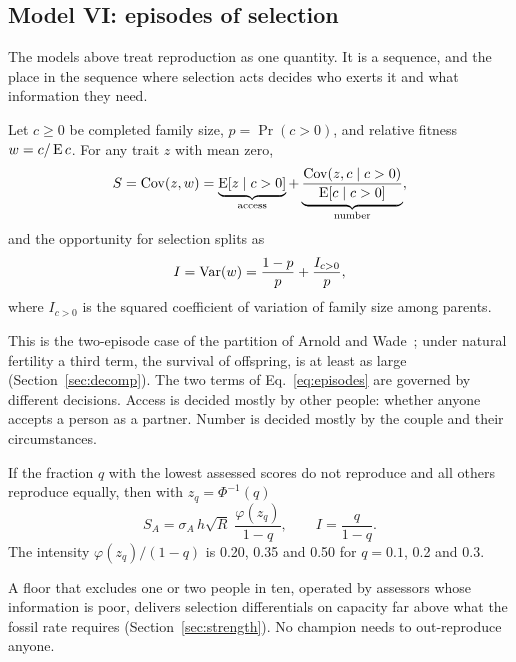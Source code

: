 \subsection{Model VI: episodes of selection}\label{sec:episodes}

The models above treat reproduction as one quantity. It is a sequence, and the place in the sequence where selection acts
decides who exerts it and what information they need.

\begin{proposition}\label{prop:episodes}
Let $c\ge0$ be completed family size, $p=\Pr(c>0)$, and relative fitness $w=c/\operatorname{E} c$. For any trait $z$ with mean zero,
\begin{equation}
S=\operatorname{Cov}(z,w)=\underbrace{\operatorname{E}[z\mid c>0]}_{\text{access}}+\underbrace{\frac{\operatorname{Cov}(z,c\mid c>0)}{\operatorname{E}[c\mid c>0]}}_{\text{number}},\label{eq:episodes}
\end{equation}
and the opportunity for selection splits as
\begin{equation}
I=\operatorname{Var}(w)=\frac{1-p}{p}+\frac{I_{c>0}}{p},\label{eq:oppsplit}
\end{equation}
where $I_{c>0}$ is the squared coefficient of variation of family size among parents.
\end{proposition}

This is the two-episode case of the partition of Arnold and Wade~\cite{arnold1984}; under natural fertility a third term, the
survival of offspring, is at least as large (Section~\ref{sec:decomp}). The two terms of Eq.~\eqref{eq:episodes} are governed by
different decisions. Access is decided mostly by other people: whether anyone accepts a person as a partner. Number is decided
mostly by the couple and their circumstances.

\begin{corollary}\label{cor:floor}
If the fraction $q$ with the lowest assessed scores do not reproduce and all others reproduce equally, then with $z_q=\Phi^{-1}(q)$
\begin{equation}
S_A=\sigma_A\,h\sqrt R\;\frac{\varphi(z_q)}{1-q},\qquad I=\frac{q}{1-q}.\label{eq:floor}
\end{equation}
The intensity $\varphi(z_q)/(1-q)$ is 0.20, 0.35 and 0.50 for $q=0.1$, 0.2 and 0.3.
\end{corollary}

A floor that excludes one or two people in ten, operated by assessors whose information is poor, delivers selection
differentials on capacity far above what the fossil rate requires (Section~\ref{sec:strength}). No champion needs to
out-reproduce anyone.

